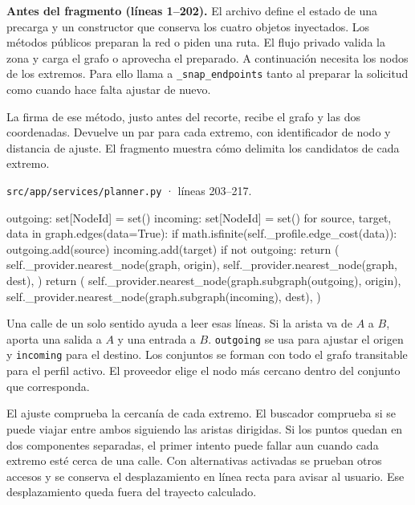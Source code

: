 \documentclass[11pt,a4paper]{article}
\begin{document}
\textbf{Antes del fragmento (líneas 1--202).} El archivo define el estado de una precarga y un constructor que conserva los cuatro objetos inyectados. Los métodos públicos preparan la red o piden una ruta. El flujo privado valida la zona y carga el grafo o aprovecha el preparado. A continuación necesita los nodos de los extremos. Para ello llama a \texttt{\_snap\_endpoints} tanto al preparar la solicitud como cuando hace falta ajustar de nuevo.

La firma de ese método, justo antes del recorte, recibe el grafo y las dos coordenadas. Devuelve un par para cada extremo, con identificador de nodo y distancia de ajuste. El fragmento muestra cómo delimita los candidatos de cada extremo.

\par\medskip
\noindent\begin{minipage}{\linewidth}
{\footnotesize\nolinkurl{src/app/services/planner.py} · líneas 203--217.\par}
\nopagebreak[4]
\begin{Codigo}[firstnumber=203]
        outgoing: set[NodeId] = set()
        incoming: set[NodeId] = set()
        for source, target, data in graph.edges(data=True):
            if math.isfinite(self._profile.edge_cost(data)):
                outgoing.add(source)
                incoming.add(target)
        if not outgoing:
            return (
                self._provider.nearest_node(graph, origin),
                self._provider.nearest_node(graph, dest),
            )
        return (
            self._provider.nearest_node(graph.subgraph(outgoing), origin),
            self._provider.nearest_node(graph.subgraph(incoming), dest),
        )
\end{Codigo}
\end{minipage}\par

Una calle de un solo sentido ayuda a leer esas líneas. Si la arista va de \(A\) a \(B\), aporta una salida a \(A\) y una entrada a \(B\). \texttt{outgoing} se usa para ajustar el origen y \texttt{incoming} para el destino. Los conjuntos se forman con todo el grafo transitable para el perfil activo. El proveedor elige el nodo más cercano dentro del conjunto que corresponda.

El ajuste comprueba la cercanía de cada extremo. El buscador comprueba si se puede viajar entre ambos siguiendo las aristas dirigidas. Si los puntos quedan en dos componentes separadas, el primer intento puede fallar aun cuando cada extremo esté cerca de una calle. Con alternativas activadas se prueban otros accesos y se conserva el desplazamiento en línea recta para avisar al usuario. Ese desplazamiento queda fuera del trayecto calculado.
\end{document}
